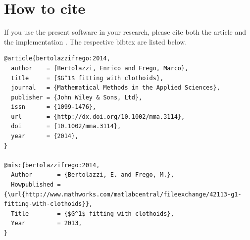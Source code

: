 \documentclass[preprint,3p]{elsarticle}
\begin{document}
\section{How to cite}
If you use the present software in your research, please cite both the article \cite{Bertolazzi:2014} and the implementation \cite{algo:ref}. The respective bibtex are listed below.
\begin{lstlisting}[breaklines, backgroundcolor=\color{gray!10},basicstyle=\small\ttfamily]
@article{bertolazzifrego:2014,
  author    = {Bertolazzi, Enrico and Frego, Marco},
  title     = {$G^1$ fitting with clothoids},
  journal   = {Mathematical Methods in the Applied Sciences},
  publisher = {John Wiley & Sons, Ltd},
  issn      = {1099-1476},
  url       = {http://dx.doi.org/10.1002/mma.3114},
  doi       = {10.1002/mma.3114},
  year      = {2014},
}

@misc{bertolazzifrego:2014,
  Author       = {Bertolazzi, E. and Frego, M.},
  Howpublished = {\url{http://www.mathworks.com/matlabcentral/fileexchange/42113-g1-fitting-with-clothoids}},
  Title        = {$G^1$ fitting with clothoids},
  Year         = 2013,
}
\end{lstlisting}
\end{document}
